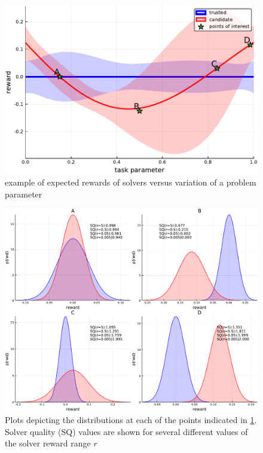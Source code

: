 \begin{figure}[tbp]
    \centering
    \includegraphics[width=0.9\linewidth]{Figures/p1}
    \caption{example of expected rewards of solvers versus variation of a problem parameter}
    \label{fig:sq_thry1}
\end{figure}

\begin{figure}[tbp]
    \centering
    \includegraphics[width=0.9\linewidth]{Figures/point_compare}
    \caption{Plots depicting the distributions at each of the points indicated in \ref{fig:sq_thry1}. Solver quality (SQ) values are shown for several different values of the solver reward range $r$}
    \label{fig:sq_thry2}
\end{figure}
